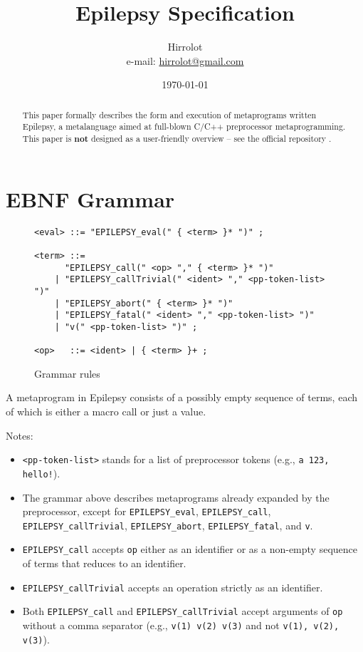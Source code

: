 \documentclass[12pt]{article}
\theoremstyle{break}
\begin{document}
\title{Epilepsy Specification}
\date{\today}
\author{Hirrolot \\ e-mail: \href{mailto:hirrolot@gmail.com}{hirrolot@gmail.com}}
\maketitle

\begin{abstract}
This paper formally describes the form and execution of metaprograms written
Epilepsy, a metalanguage aimed at full-blown C/C++ preprocessor metaprogramming. This paper
is \textbf{not} designed as a user-friendly overview -- see the official repository
\cite{Epilepsy}.
\end{abstract}

\tableofcontents

\newpage

\section{EBNF Grammar}

\begin{figure}[H]
    \caption{Grammar rules}

\begin{verbatim}
<eval> ::= "EPILEPSY_eval(" { <term> }* ")" ;

<term> ::=
      "EPILEPSY_call(" <op> "," { <term> }* ")"
    | "EPILEPSY_callTrivial(" <ident> "," <pp-token-list> ")"
    | "EPILEPSY_abort(" { <term> }* ")"
    | "EPILEPSY_fatal(" <ident> "," <pp-token-list> ")"
    | "v(" <pp-token-list> ")" ;

<op>   ::= <ident> | { <term> }+ ;
\end{verbatim}

\end{figure}

A metaprogram in Epilepsy consists of a possibly empty sequence of terms, each of which
is either a macro call or just a value.

Notes:

\begin{itemize}
    \item \texttt{<pp-token-list>} stands for a list of preprocessor tokens (e.g., \texttt{a 123, hello!}).
    \item The grammar above describes metaprograms already expanded by the preprocessor,
    except for \texttt{EPILEPSY\_eval}, \texttt{EPILEPSY\_call},\\\texttt{EPILEPSY\_callTrivial},
    \texttt{EPILEPSY\_abort}, \texttt{EPILEPSY\_fatal}, and \texttt{v}.
    \item \texttt{EPILEPSY\_call} accepts \texttt{op} either as an identifier or as a non-empty
    sequence of terms that reduces to an identifier.
    \item \texttt{EPILEPSY\_callTrivial} accepts an operation strictly as an identifier.
    \item Both \texttt{EPILEPSY\_call} and \texttt{EPILEPSY\_callTrivial} accept arguments of \texttt{op}
    without a comma separator (e.g., \texttt{v(1) v(2) v(3)} and not \texttt{v(1), v(2), v(3)}).
\end{itemize}
\end{document}
